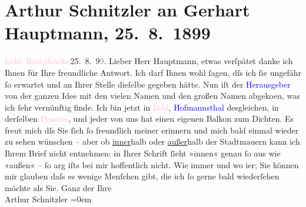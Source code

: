 

               \section[Arthur Schnitzler an Gerhart Hauptmann, 25. 8. 1899]{ Arthur Schnitzler an Gerhart Hauptmann, 25. 8. 1899}\nopagebreak{}\rehead{ }\normalsize\beginnumbering{} \toendnotes[C]{\smallbreak\pagebreak[2]} 
\toendnotes[C]{\smallbreak}\pstart
           \raggedleft{}{\pb}\textcolor{pink}{Ischl, Rudolfshöhe}{}\ledrightnote{\textcolor{pink}{Hotel und Pension Rudolfshöhe (Leopold Petter)}}{\\}25. 8. 9\textcolor{gray}{9}.
                    \pend
           \pstart{}Lieber Herr Hauptmann,\pend\pstart
           etwas verſpätet danke ich Ihnen für Ihre freundliche Antwort. Ich darf Ihnen wohl
                    ſagen, dſs ich ſie ungefähr ſo erwartet und an Ihrer Stelle dieſelbe gegeben
                    hätte. Nun iſt der \textcolor{blue}{Heraus{\pb}geber}{} von der ganzen Idee mit den vielen
                    Namen und den großen Namen abgeko{\geminationm}en, was ich ſehr
                    vernünftig finde.\pend
           \pstart
           Ich bin jetzt in \textcolor{pink}{Iſchl}{}\ledrightnote{\textcolor{pink}{Bad Ischl}}, \textcolor{blue}{Hofmannsthal}{}\ledrightnote{\textcolor{blue}{Hugo von Hofmannsthal}} desgleichen, in derſelben \textcolor{pink}{Pension}{}, und jeder von uns hat einen
                    eigenen {\pb}Balkon zum Dichten.\pend
           \pstart
           Es freut mich dſs Sie ſich ſo freundlich meiner erinnern und mich bald einmal
                    wieder zu sehen wünschen – aber ob \uline{inner}halb
                    oder \uline{außer}halb der Stadtmauern kann ich Ihrem
                    Brief nicht entnehmen: in Ihrer Schrift ſieht {\pb}»innen«
                    genau ſo aus wie »außen« – ſo arg iſts bei mir hoffentlich nicht.\pend
           \pstart
           Wie immer und wo i{\geminationm}er; Sie können mir glauben daſs
                    es wenige Menſchen gibt, die ich ſo gerne bald wiederſehen möchte als Sie.\pend
           \pstart
           Ganz der Ihre{\\[\baselineskip]}Arthur Schnitzler\pend
           \leftskip=0em{}\endnumbering{}  
      